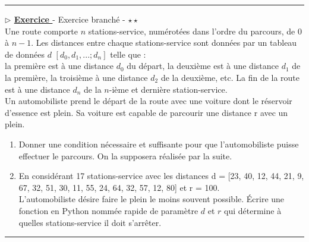 \documentclass[12pt,french]{article}
\newcounter{npb}
\newcommand{\exo}{
    \stepcounter{npb}
    {\textbf{$\triangleright$ \underline{Exercice \arabic{npb} }}}
}
\begin{document}
\hrule
\medskip
\exo  - Exercice branché - $\star\star$ \\
Une route comporte $n$ stations-service, numérotées dans l'ordre du parcours, de 0 à $n-1$. Les distances entre chaque stations-service sont données par un tableau de données $d$ $[d_0,d_1, ...; d_n]$ telle que : \\
la première est à une distance $d_0$ du départ, la deuxième est à une distance $d_1$ de la première, la troisième à une distance $d_2$ de la deuxième, etc. La fin de la route est à une distance $d_n$ de la $n$-ième et dernière station-service.\\
Un automobiliste prend le départ de la route avec une voiture dont le réservoir d'essence est plein.
Sa voiture est capable de parcourir une distance r avec un plein.
\begin{enumerate}
\item Donner une condition nécessaire et suffisante pour que l'automobiliste puisse effectuer le
parcours. On la supposera réalisée par la suite.
\item En considérant 17 stations-service avec les distances d = [23, 40, 12, 44, 21, 9, 67, 32, 51, 30, 11, 55, 24,
64, 32, 57, 12, 80] et r = 100.\\
L'automobiliste désire faire le plein le moins souvent possible. Écrire une fonction en Python nommée rapide de paramètre $d$ et $r$ qui détermine à quelles stations-service il doit s'arrêter.
\end{enumerate}
\hrule
\end{document}
